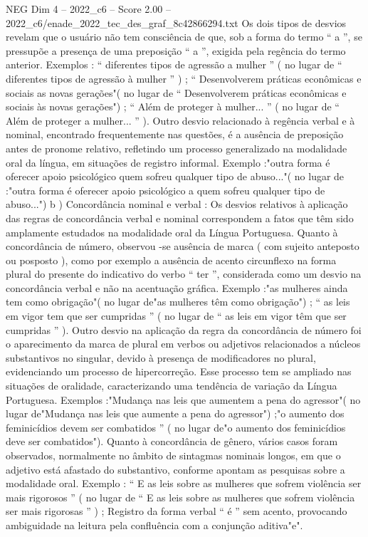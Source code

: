 \begin{textsample}{NEG Dim 4 – 2022\_c6 – Score 2.00 – 2022\_c6/enade\_2022\_tec\_des\_graf\_8c42866294.txt}
Os dois tipos de desvios revelam que o usuário não tem consciência de que, sob a forma do termo “ a ”, se pressupõe a presença de uma preposição “ a ”, exigida pela regência do termo anterior.
Exemplos : “ diferentes tipos de agressão a mulher ” ( no lugar de “ diferentes tipos de agressão à mulher ” ) ; “ Desenvolverem práticas econômicas e sociais as novas gerações"( no lugar de “ Desenvolverem práticas econômicas e sociais às novas gerações") ; “ Além de proteger à mulher... ” ( no lugar de “ Além de proteger a mulher... ” ).
Outro desvio relacionado à regência verbal e à nominal, encontrado frequentemente nas questões, é a ausência de preposição antes de pronome relativo, refletindo um processo generalizado na modalidade oral da língua, em situações de registro informal.
Exemplo :"outra forma é oferecer apoio psicológico quem sofreu qualquer tipo de abuso..."( no lugar de :"outra forma é oferecer apoio psicológico a quem sofreu qualquer tipo de abuso...") b ) Concordância nominal e verbal : Os desvios relativos à aplicação das regras de concordância verbal e nominal correspondem a fatos que têm sido amplamente estudados na modalidade oral da Língua Portuguesa.
Quanto à concordância de número, observou -se ausência de marca ( com sujeito anteposto ou posposto ), como por exemplo a ausência de acento circunflexo na forma plural do presente do indicativo do verbo “ ter ”, considerada como um desvio na concordância verbal e não na acentuação gráfica.
Exemplo :"as mulheres ainda tem como obrigação"( no lugar de"as mulheres têm como obrigação") ; “ as leis em vigor tem que ser cumpridas ” ( no lugar de “ as leis em vigor têm que ser cumpridas ” ).
Outro desvio na aplicação da regra da concordância de número foi o aparecimento da marca de plural em verbos ou adjetivos relacionados a núcleos substantivos no singular, devido à presença de modificadores no plural, evidenciando um processo de hipercorreção.
Esse processo tem se ampliado nas situações de oralidade, caracterizando uma tendência de variação da Língua Portuguesa.
Exemplos :"Mudança nas leis que aumentem a pena do agressor"( no lugar de"Mudança nas leis que aumente a pena do agressor") ;"o aumento dos feminicídios devem ser combatidos ” ( no lugar de"o aumento dos feminicídios deve ser combatidos").
Quanto à concordância de gênero, vários casos foram observados, normalmente no âmbito de sintagmas nominais longos, em que o adjetivo está afastado do substantivo, conforme apontam as pesquisas sobre a modalidade oral.
Exemplo : “ E as leis sobre as mulheres que sofrem violência ser mais rigorosos ” ( no lugar de “ E as leis sobre as mulheres que sofrem violência ser mais rigorosas ” ) ; Registro da forma verbal “ é ” sem acento, provocando ambiguidade na leitura pela confluência com a conjunção aditiva"e".

\end{textsample}
